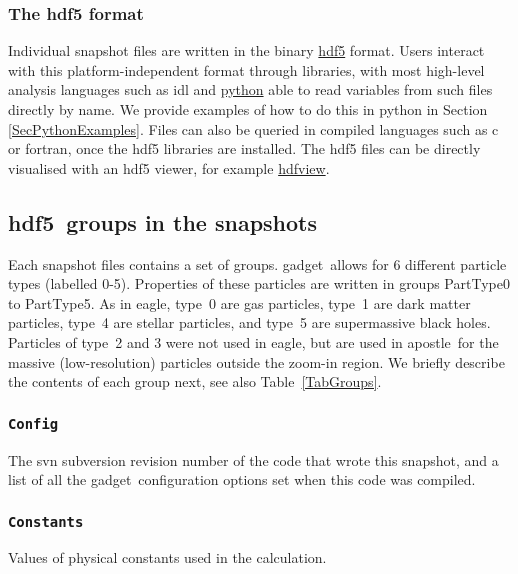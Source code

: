 \documentclass[10pt, a4paper]{article}
\newcommand{\eagle}{{\sc eagle}}
\newcommand{\apostle}{{\sc apostle}}
\newcommand{\hdf}{{\sc hdf5}}
\newcommand{\gadget}{{\sc gadget}}
\begin{document}
\subsubsection{The {\sc hdf5} format}

Individual snapshot files are written in the binary {\color{blue}\href{https://www.hdfgroup.org/HDF5/}{\sc hdf5} format}. Users interact with this platform-independent format through libraries, with most high-level analysis languages such as {\sc idl} and {\color{blue}\href{https://www.python.org/}{\sc python}} able to read variables from such files directly by name. We provide examples of how to do this in {\sc python} in Section \ref{SecPythonExamples}.  Files can also be queried in compiled languages such as {\sc c} or {\sc fortran}, once the {\sc hdf5} libraries are installed. The {\sc hdf5} files can be directly visualised with an {\sc hdf5} viewer, for example {\color{blue}\href{https://www.hdfgroup.org/hdf-java-html/hdfview/}{hdfview}}.

\subsection{\hdf\ groups in the snapshots}
\label{SecFOF}
Each snapshot files contains a set of groups. \gadget\ allows for 6 different particle types (labelled 0-5). Properties of these particles are written in groups PartType0 to PartType5. As in \eagle, type~0 are gas particles, type~1 are dark matter particles, type~4 are stellar particles, and type~5 are supermassive black holes. Particles of type~2 and 3 were not used in \eagle, but are used in \apostle\ for the massive (low-resolution) particles outside the zoom-in region. We briefly describe the contents of each group next, see also Table~\ref{TabGroups}.

\subsubsection{\texttt{Config}}

The svn subversion revision number of the code that wrote this snapshot, and a list of all the \gadget\ configuration options set when this code was compiled.

\subsubsection{\texttt{Constants}}

Values of physical constants used in the calculation.
\end{document}
